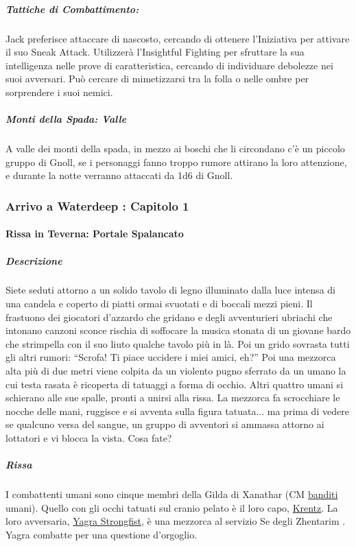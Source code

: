 \documentclass{article}
\begin{document}
\subparagraph*{Tattiche di Combattimento:}
Jack preferisce attaccare di nascosto, cercando di ottenere l'Iniziativa per attivare il suo Sneak Attack. Utilizzerà l'Insightful Fighting per sfruttare la sua intelligenza nelle prove di caratteristica, cercando di individuare debolezze nei suoi avversari. Può cercare di mimetizzarsi tra la folla o nelle ombre per sorprendere i suoi nemici.

\subparagraph{Monti della Spada: Valle}
A valle dei monti della spada, in mezzo ai boschi che li circondano c'è un piccolo gruppo di Gnoll, se i personaggi fanno troppo rumore attirano la loro attenzione, e durante la notte verranno attaccati da 1d6 di Gnoll. 

\subsubsection{Arrivo a Waterdeep : Capitolo 1}

\paragraph{Rissa in Teverna: Portale Spalancato}
\subparagraph{Descrizione}Siete seduti attorno a un solido tavolo di legno illuminato
dalla luce intensa di una candela e coperto di piatti
ormai svuotati e di boccali mezzi pieni. Il frastuono
dei giocatori d'azzardo che gridano e degli avventurieri
ubriachi che intonano canzoni sconce rischia di soffocare
la musica stonata di un giovane bardo che strimpella con
il suo liuto qualche tavolo più in là.
Poi un grido sovrasta tutti gli altri rumori: “Scrofa! Ti
piace uccidere i miei amici, eh?” Poi una mezzorca alta più
di due metri viene colpita da un violento pugno sferrato
da un umano la cui testa rasata è ricoperta di tatuaggi
a forma di occhio. Altri quattro umani si schierano alle
sue spalle, pronti a unirsi alla rissa. La mezzorca fa
scrocchiare le nocche delle mani, ruggisce e si avventa
sulla figura tatuata... ma prima di vedere se qualcuno
versa del sangue, un gruppo di avventori si ammassa
attorno ai lottatori e vi blocca la vista. Cosa fate?

\subparagraph{Rissa}I combattenti umani sono cinque membri della Gilda
di Xanathar (CM \hyperlink{banditi}{banditi} umani). Quello con gli occhi
tatuati sul cranio pelato è il loro capo, \hyperlink{krent}{ Krentz}. La loro
avversaria, \hyperlink{yagra}{Yagra Strongfist}, è una mezzorca al servizio Se
degli Zhentarim . Yagra combatte per una
questione d'orgoglio.
\end{document}
